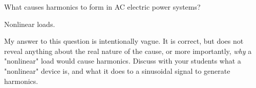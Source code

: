 

What causes harmonics to form in AC electric power systems?







Nonlinear loads.







My answer to this question is intentionally vague.  It is correct, but does not reveal anything about the real nature of the cause, or more importantly, {\it why} a "nonlinear" load would cause harmonics.  Discuss with your students what a "nonlinear" device is, and what it does to a sinusoidal signal to generate harmonics.




